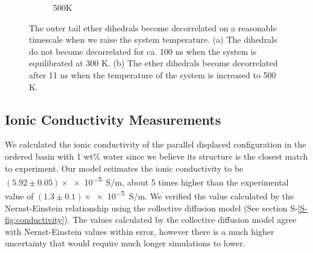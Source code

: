 \documentclass[journal=jpcbfk,manuscript=article]{achemso}
\begin{document}
\begin{figure}[!htb]
\begin{subfigure}{0.45\textwidth}
  	\caption{500K}\label{fig:dihedrals_500K}
  \end{subfigure}
  \caption{The outer tail ether dihedrals become decorrelated on a reasonable
  timescale when we raise the system temperature. (a) The dihedrals do not
  become decorrelated for ca. 100 ns when the system is equilibrated at 300 K.
  (b) The ether dihedrals become decorrelated after 11 ns when the temperature
  of the system is increased to 500 K.}\label{fig:dihedrals}
  \end{figure}
  
  \subsection{Ionic Conductivity Measurements}
 

  
  
  
  We calculated the ionic conductivity of the parallel displaced configuration in
  the ordered basin with 1 wt\% water since we believe its structure is the 
  closest match to experiment. Our model estimates the ionic conductivity to be
  $(5.92 \pm 0.05)\times$\num{e-5}~S/m, about 5 times higher than the experimental value of 
  $(1.3 \pm 0.1)\times$\num{e-5}~S/m. We verified the value calculated by the Nernst-Einstein
  relationship using the collective diffusion model\cite{liu_collective_2013} 
  (See section S-\ref{S-fig:conductivity}). The values calculated by the 
  collective diffusion model agree with Nernst-Einstein values within error, 
  however there is a much higher uncertainty that would require much longer 
  simulations to lower.
  
\end{document}
